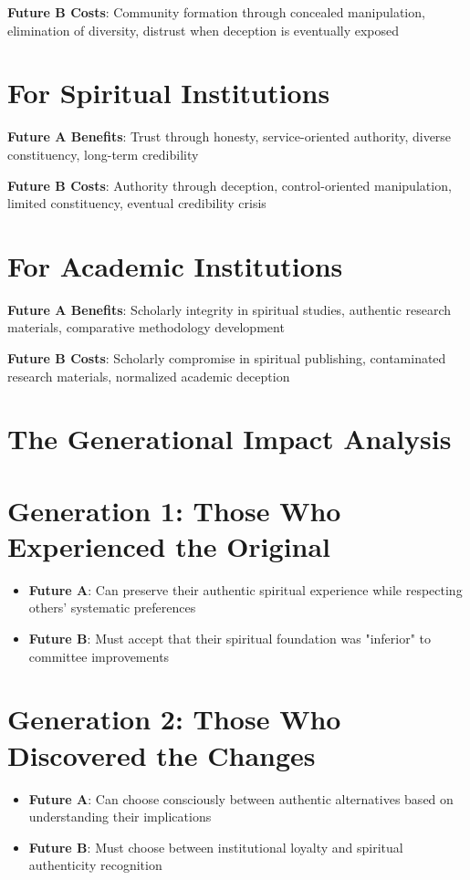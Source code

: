 \documentclass[11pt,twoside]{book}
\begin{document}
\textbf{\textbf{Future B Costs}}: Community formation through concealed manipulation, elimination of diversity, distrust when deception is eventually exposed
\section*{For Spiritual Institutions}
\label{sec:orge4f00ab}
\textbf{\textbf{Future A Benefits}}: Trust through honesty, service-oriented authority, diverse constituency, long-term credibility

\textbf{\textbf{Future B Costs}}: Authority through deception, control-oriented manipulation, limited constituency, eventual credibility crisis
\section*{For Academic Institutions}
\label{sec:org4144941}
\textbf{\textbf{Future A Benefits}}: Scholarly integrity in spiritual studies, authentic research materials, comparative methodology development

\textbf{\textbf{Future B Costs}}: Scholarly compromise in spiritual publishing, contaminated research materials, normalized academic deception
\section*{The Generational Impact Analysis}
\label{sec:org9fdfc9d}

\section*{Generation 1: Those Who Experienced the Original}
\label{sec:org29a5e78}
\begin{itemize}
\item \textbf{\textbf{Future A}}: Can preserve their authentic spiritual experience while respecting others' systematic preferences
\item \textbf{\textbf{Future B}}: Must accept that their spiritual foundation was "inferior" to committee improvements
\end{itemize}
\section*{Generation 2: Those Who Discovered the Changes}
\label{sec:org5d24c01}
\begin{itemize}
\item \textbf{\textbf{Future A}}: Can choose consciously between authentic alternatives based on understanding their implications
\item \textbf{\textbf{Future B}}: Must choose between institutional loyalty and spiritual authenticity recognition
\end{itemize}
\end{document}

